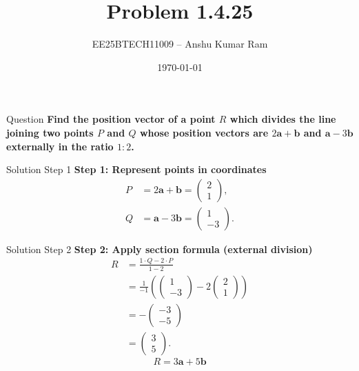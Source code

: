 \documentclass{beamer}
\title{Problem 1.4.25}
\author{EE25BTECH11009 – Anshu Kumar Ram}
\date{\today}
\newcommand{\brak}[1]{\begin{pmatrix}#1\end{pmatrix}}
\begin{document}
\begin{frame}
    \titlepage
\end{frame}

\begin{frame}{Question}
\textbf{Find the position vector of a point \( R \) which divides the line joining two points \( P \) and \( Q \) whose position vectors are \(2\mathbf a + \mathbf b\) and \(\mathbf a - 3\mathbf b\) externally in the ratio \(1:2\).}
\end{frame}

\begin{frame}{Solution Step 1}
\textbf{Step 1: Represent points in coordinates}  
\begin{align*}
P &= 2\mathbf a + \mathbf b = \brak{2\\1}, \\
Q &= \mathbf a - 3\mathbf b = \brak{1\\-3}.
\end{align*}
\end{frame}

\begin{frame}{Solution Step 2}
\textbf{Step 2: Apply section formula (external division)}
\begin{align*}
R &= \frac{1 \cdot Q - 2 \cdot P}{1 - 2} \\[2pt]
  &= \frac{1}{-1}\left(\begin{pmatrix}1\\-3\end{pmatrix} - 2\begin{pmatrix}2\\1\end{pmatrix}\right) \\[2pt]
  &= -\begin{pmatrix}-3\\-5\end{pmatrix} \\[2pt]
  &= \begin{pmatrix}3\\5\end{pmatrix}.
\end{align*}
\[
\boxed{R = 3\mathbf{a} + 5\mathbf{b}}
\]
\end{frame}
\end{document}
